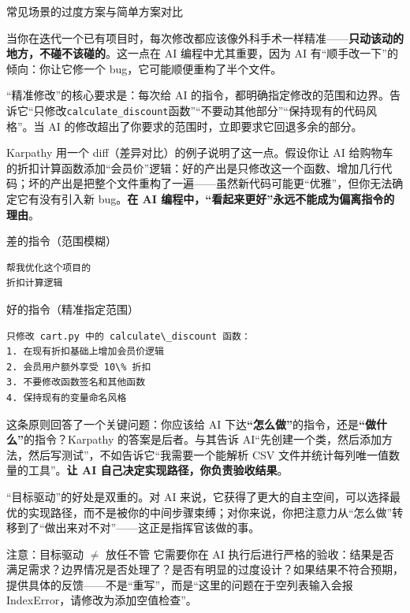 \begin{center}\small\color{gray}常见场景的过度方案与简单方案对比\end{center}


当你在迭代一个已有项目时，每次修改都应该像外科手术一样精准——\textbf{只动该动的地方，不碰不该碰的}。这一点在 AI 编程中尤其重要，因为 AI 有“顺手改一下”的倾向：你让它修一个 bug，它可能顺便重构了半个文件。

“精准修改”的核心要求是：每次给 AI 的指令，都明确指定修改的范围和边界。告诉它“只修改\texttt{calculate\_discount}函数”“不要动其他部分”“保持现有的代码风格”。当 AI 的修改超出了你要求的范围时，立即要求它回退多余的部分。

Karpathy 用一个 diff（差异对比）的例子说明了这一点。假设你让 AI 给购物车的折扣计算函数添加“会员价”逻辑：好的产出是只修改这一个函数、增加几行代码；坏的产出是把整个文件重构了一遍——虽然新代码可能更“优雅”，但你无法确定它有没有引入新 bug。\textbf{在 AI 编程中，“看起来更好”永远不能成为偏离指令的理由}。

差的指令（范围模糊）

\begin{lstlisting}
帮我优化这个项目的
折扣计算逻辑
\end{lstlisting}

好的指令（精准指定范围）

\begin{lstlisting}
只修改 cart.py 中的 calculate\_discount 函数：
1. 在现有折扣基础上增加会员价逻辑
2. 会员用户额外享受 10\% 折扣
3. 不要修改函数签名和其他函数
4. 保持现有的变量命名风格
\end{lstlisting}


这条原则回答了一个关键问题：你应该给 AI 下达\textbf{“怎么做”}的指令，还是\textbf{“做什么”}的指令？Karpathy 的答案是后者。与其告诉 AI“先创建一个类，然后添加方法，然后写测试”，不如告诉它“我需要一个能解析 CSV 文件并统计每列唯一值数量的工具”。\textbf{让 AI 自己决定实现路径，你负责验收结果}。

“目标驱动”的好处是双重的。对 AI 来说，它获得了更大的自主空间，可以选择最优的实现路径，而不是被你的中间步骤束缚；对你来说，你把注意力从“怎么做”转移到了“做出来对不对”——这正是指挥官该做的事。

\begin{tcbwarn}{注意：目标驱动 $\neq$ 放任不管}
它需要你在 AI 执行后进行严格的验收：结果是否满足需求？边界情况是否处理了？是否有明显的过度设计？如果结果不符合预期，提供具体的反馈——不是“重写”，而是“这里的问题在于空列表输入会报 IndexError，请修改为添加空值检查”。

\end{tcbwarn}

